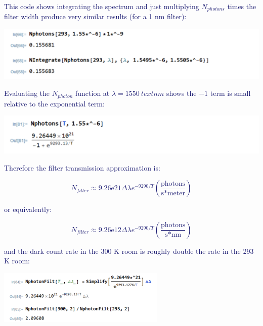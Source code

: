 \documentclass[11pt]{caltech_thesis} %
\begin{document}
\begin{enumerate}
{  }

  \textcolor{midnightblue}{This code shows integrating the spectrum and just multiplying $N_{photons}$ times the filter width produce very similar results (for a 1 nm filter):}

  \textcolor{midnightblue}{\includegraphics{./chapter_07/figs/nphoton_approx.PNG}}

  \textcolor{midnightblue}{Evaluating the $N_{photon}$ function at $\lambda = 1550~text{nm}$ shows the $-1$ term is small relative to the exponential term:}

  \textcolor{midnightblue}{\includegraphics{./chapter_07/figs/small_relative_to_exponential.PNG}}

  \textcolor{midnightblue}{Therefore the filter transmission approximation is:}

  \textcolor{midnightblue}{

  $$\boxed{N_{filter} \approx 9.26\mathrm{e}21 \Delta\lambda e^{-9290/T} (\frac{\text{photons}}{\text{s*meter}})}$$

  }

  \textcolor{midnightblue}{or equivalently: }

  \textcolor{midnightblue}{

  $$\boxed{N_{filter} \approx 9.26\mathrm{e}12 \Delta\lambda e^{-9290/T} (\frac{\text{photons}}{\text{s*nm}})}$$

  }

  \textcolor{midnightblue}{and the dark count rate in the 300 K room is roughly double the rate in the 293 K room: }

  \textcolor{midnightblue}{\includegraphics[width=0.6\textwidth,height=\textheight]{./chapter_07/figs/filter_with_temp.PNG}}


\end{enumerate}
\end{document}
